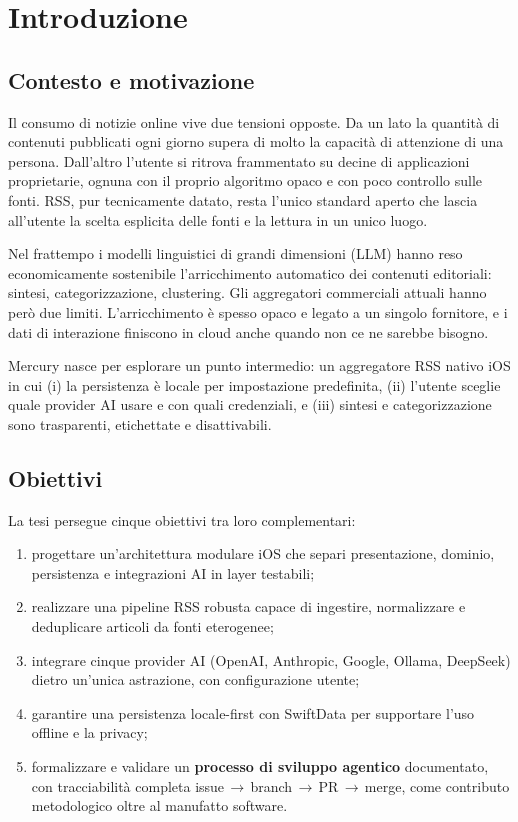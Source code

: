 \chapter{Introduzione}
\label{cap:introduzione}

\section{Contesto e motivazione}
Il consumo di notizie online vive due tensioni opposte. Da un lato la quantità
di contenuti pubblicati ogni giorno supera di molto la capacità di attenzione
di una persona. Dall'altro l'utente si ritrova frammentato su decine di
applicazioni proprietarie, ognuna con il proprio algoritmo opaco e con poco
controllo sulle fonti. RSS, pur tecnicamente datato, resta l'unico standard
aperto che lascia all'utente la scelta esplicita delle fonti e la lettura in un
unico luogo.

Nel frattempo i modelli linguistici di grandi dimensioni (LLM) hanno reso
economicamente sostenibile l'arricchimento automatico dei contenuti editoriali:
sintesi, categorizzazione, clustering. Gli aggregatori commerciali attuali
hanno però due limiti. L'arricchimento è spesso opaco e legato a un singolo
fornitore, e i dati di interazione finiscono in cloud anche quando non ce ne
sarebbe bisogno.

Mercury nasce per esplorare un punto intermedio: un aggregatore RSS nativo iOS
in cui (i) la persistenza è locale per impostazione predefinita, (ii) l'utente
sceglie quale provider AI usare e con quali credenziali, e (iii) sintesi e
categorizzazione sono trasparenti, etichettate e disattivabili.

\section{Obiettivi}
La tesi persegue cinque obiettivi tra loro complementari:
\begin{enumerate}
  \item progettare un'architettura modulare iOS che separi presentazione,
        dominio, persistenza e integrazioni AI in layer testabili;
  \item realizzare una pipeline RSS robusta capace di ingestire, normalizzare
        e deduplicare articoli da fonti eterogenee;
  \item integrare cinque provider AI (OpenAI, Anthropic, Google, Ollama, DeepSeek)
        dietro un'unica astrazione, con configurazione utente;
  \item garantire una persistenza locale-first con SwiftData per supportare
        l'uso offline e la privacy;
  \item formalizzare e validare un \textbf{processo di sviluppo agentico}
        documentato, con tracciabilità completa issue\,$\to$\,branch\,$\to$\,PR\,$\to$\,merge,
        come contributo metodologico oltre al manufatto software.
\end{enumerate}

